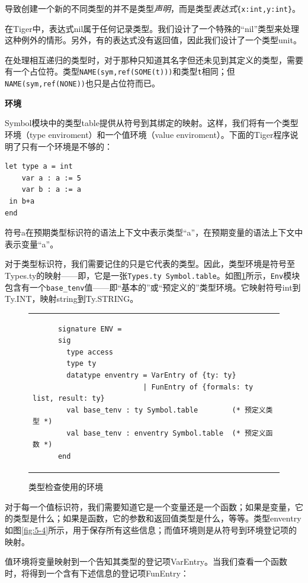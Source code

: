\documentclass[cn,11pt,chinese]{elegantbook}
\begin{document}
导致创建一个新的不同类型的并不是类型\textit{声明}，而是类型\textit{表达式}\lstinline|{x:int,y:int}|。

在Tiger中，表达式nil属于任何记录类型。我们设计了一个特殊的“nil”类型来处理这种例外的情形。另外，有的表达式没有返回值，因此我们设计了一个类型unit。

在处理相互递归的类型时，对于那种只知道其名字但还未见到其定义的类型，需要有一个占位符。类型\lstinline{NAME(sym,ref(SOME(t)))}和类型\lstinline{t}相同；但\lstinline{NAME(sym,ref(NONE))}也只是占位符而已。

\textbf{环境}

Symbol模块中的类型table提供从符号到其绑定的映射。这样，我们将有一个类型环境（type enviroment）和一个值环境（value enviroment）。下面的Tiger程序说明了只有一个环境是不够的：

\begin{lstlisting}
let type a = int
    var a : a := 5
    var b : a := a
 in b+a
end
\end{lstlisting}

符号a在预期类型标识符的语法上下文中表示类型“a”，在预期变量的语法上下文中表示变量“a”。

对于类型标识符，我们需要记住的只是它代表的类型。因此，类型环境是符号至Types.ty的映射——即，它是一张\lstinline|Types.ty Symbol.table|。如图\ref{fig:5-8}所示，\lstinline{Env}模块包含有一个\lstinline{base_tenv}值——即“基本的”或“预定义的”类型环境。它映射符号int到Ty.INT，映射string到Ty.STRING。

\begin{figure}[htbp]
  \centering
  \begin{tabular}{l}
    \begin{lstlisting}
      signature ENV =
      sig
        type access
        type ty
        datatype enventry = VarEntry of {ty: ty}
                          | FunEntry of {formals: ty list, result: ty}
        val base_tenv : ty Symbol.table        (* 预定义类型 *)
        val base_tenv : enventry Symbol.table  (* 预定义函数 *)
      end
    \end{lstlisting}
  \end{tabular}
  \caption{类型检查使用的环境}
  \label{fig:5-8}
\end{figure}

对于每一个值标识符，我们需要知道它是一个变量还是一个函数；如果是变量，它的类型是什么；如果是函数，它的参数和返回值类型是什么，等等。类型enventry如图\ref{fig:5-4}所示，用于保存所有这些信息；而值环境则是从符号到环境登记项的映射。

值环境将变量映射到一个告知其类型的登记项VarEntry。当我们查看一个函数时，将得到一个含有下述信息的登记项FunEntry：
\end{document}
